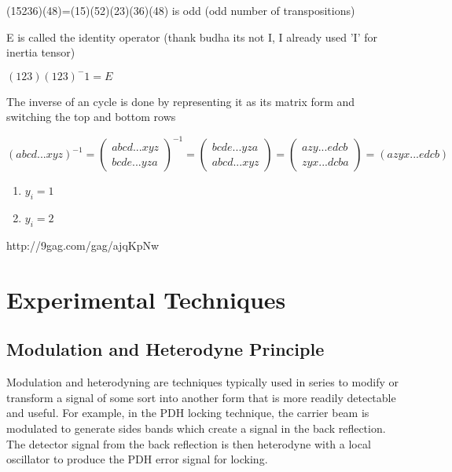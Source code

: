 \documentclass[11pt,a4paper]{book}
\begin{document}
		(15236)(48)=(15)(52)(23)(36)(48) is odd (odd number of transpositions)
		
		E is called the identity operator (thank budha its not I, I already used 'I' for inertia tensor)
		
		$(123)(123)^-1 = E$
		
		The inverse of an cycle is done by representing it as its matrix form and switching the top and bottom rows
		
		\begin{equation}
		(abcd...xyz)^{-1}
		=
		\begin{pmatrix}
		abcd...xyz\\
		bcde...yza
		\end{pmatrix}^{-1}
		=
		\begin{pmatrix}
		bcde...yza\\
		abcd...xyz
		\end{pmatrix}
		=
		\begin{pmatrix}
		azy...edcb\\
		zyx...dcba
		\end{pmatrix}
		=(azyx...edcb)		
		\end{equation}
		
		\begin{enumerate}
			\item \(y_i=1\)
			\item \(y_i=2\)
		\end{enumerate}
		http://9gag.com/gag/ajqKpNw

\chapter{Experimental Techniques}
	\section{Modulation and Heterodyne Principle}
		\label{sec:Modulation and Heterodyne Principle}
		Modulation and heterodyning are techniques typically used in series to modify or transform a signal of some sort into another form that is more readily detectable and useful. For example, in the PDH locking technique, the carrier beam is modulated to generate sides bands which create a signal in the back reflection. The detector signal from the back reflection is then heterodyne with a local oscillator to produce the PDH error signal for locking.
\end{document}
